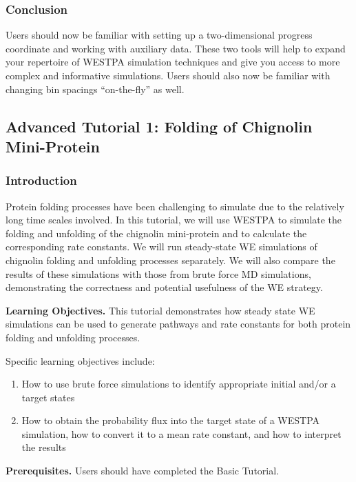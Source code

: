 \documentclass[9pt,tutorial,ASAPversion]{livecoms}
\begin{document}
\subsubsection{Conclusion}

Users should now be familiar with setting up a two-dimensional progress coordinate and working with auxiliary data. 
These two tools will help to expand your repertoire of WESTPA simulation techniques and give you access to more complex and informative simulations. 
Users should also now be familiar with changing bin spacings “on-the-fly” as well. 

\subsection{Advanced Tutorial 1: Folding of Chignolin Mini-Protein}

\subsubsection{Introduction}

Protein folding processes have been challenging to simulate due to the relatively long time scales involved. 
In this tutorial, we will use WESTPA to simulate the folding and unfolding of the chignolin mini-protein and to calculate the corresponding rate constants. 
We will run steady-state WE simulations of chignolin folding and unfolding processes separately. 
We will also compare the results of these simulations with those from brute force MD simulations, demonstrating the correctness and potential usefulness of the WE strategy. 
 
\textbf{Learning Objectives.} This tutorial demonstrates how steady state WE simulations can be used to generate pathways and rate constants for both protein folding and unfolding processes.  

Specific learning objectives include:
\begin{enumerate}
\item How to use brute force simulations to identify appropriate initial and/or a target states
\item How to obtain the probability flux into the target state of a WESTPA simulation, how to convert it to a mean rate constant, and how to interpret the results
\end{enumerate}

\textbf{Prerequisites.} Users should have completed the Basic Tutorial.
 
\end{document}
